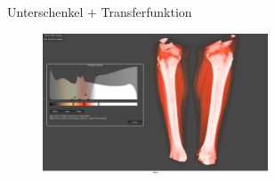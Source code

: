 \documentclass[final,hyperref={pdfpagelabels=false}]{beamer}
\begin{document}
\begin{frame}[t]
\begin{columns}[t]
\begin{column}{.465\textwidth}
\end{column} %



\begin{column}{.025\textwidth}\end{column} %

\begin{column}{.465\textwidth}


\begin{block}{Unterschenkel + Transferfunktion}
  
    \begin{figure}
    	\center
        \includegraphics[width=0.7\textwidth]{KnieTransferfunktion}
        
    \end{figure}
   
     
   
   
\end{block}


\end{column} %



\begin{column}{.025\textwidth}\end{column} %

\end{columns} %


\begin{columns}[t] %


\end{columns}
\end{frame}
\end{document}
